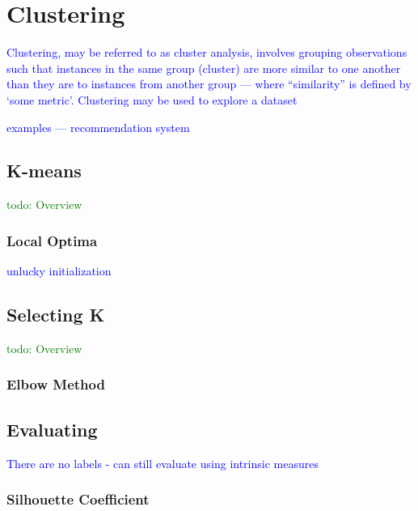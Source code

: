 \section{Clustering}

\textcolor{blue}{Clustering, may be referred to as cluster analysis, involves grouping observations such that instances in the same group (cluster) are more similar to one another than they are to instances from another group --- where ``similarity'' is defined by `some metric'. Clustering may be used to explore a dataset}

\textcolor{blue}{examples --- recommendation system}

\subsection{K-means}

\textcolor{green}{todo: Overview}

\textcolor{blue}{}

\subsubsection{Local Optima}

\textcolor{blue}{unlucky initialization}

\subsection{Selecting K}

\textcolor{green}{todo: Overview}

\subsubsection{Elbow Method}

\subsection{Evaluating}

\textcolor{blue}{There are no labels - can still evaluate using intrinsic measures}

\subsubsection{Silhouette Coefficient}